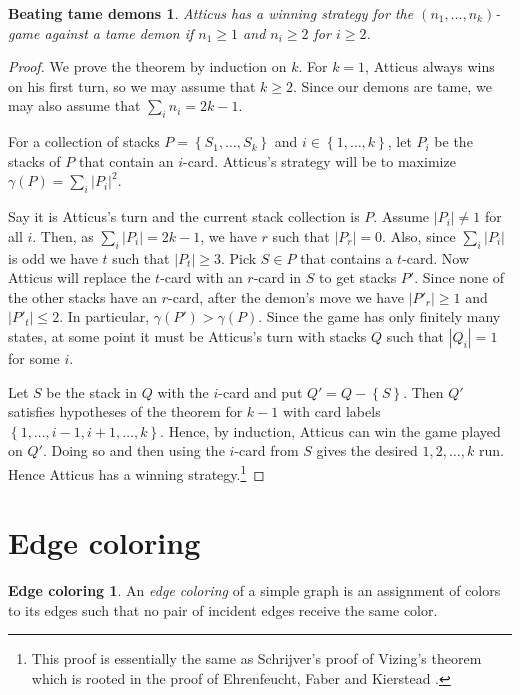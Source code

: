\documentclass[12pt]{article}
\theoremstyle{plain}
\newtheorem*{beattame}{Beating tame demons}
\theoremstyle{definition}
\newtheorem*{edgecoloring}{Edge coloring}
\theoremstyle{remark}
\newcommand{\set}[1]{\left\{ #1 \right\}}
\newcommand{\card}[1]{\left|#1\right|}
\begin{document}
\begin{beattame}
Atticus has a winning strategy for the $(n_1, \ldots, n_k)$-game against a tame demon if $n_1 \geq 1$ and $n_i \geq 2$ for $i \geq 2$.
\end{beattame}
\begin{proof}
We prove the theorem by induction on $k$.  For $k=1$, Atticus always wins on his first turn, so we may assume that $k \geq 2$.  Since our demons are tame, we may also assume that $\sum_i n_i = 2k-1$.

For a collection of stacks $P = \set{S_1, \ldots, S_k}$ and $i \in \set{1, \ldots, k}$, let $P_i$ be the stacks of $P$ that contain an $i$-card.  Atticus's strategy will be to maximize $\gamma(P) = \sum_i \card{P_i}^2$.

Say it is Atticus's turn and the current stack collection is $P$.  Assume $\card{P_i} \neq 1$ for all $i$.  Then, as $\sum_i \card{P_i} = 2k-1$, we have $r$ such that $\card{P_r} = 0$.  Also, since $\sum_i \card{P_i}$ is odd we have $t$ such that $\card{P_t} \geq 3$.  Pick $S \in P$ that contains a $t$-card.  Now Atticus will replace the $t$-card with an $r$-card in $S$ to get stacks $P'$.  Since none of the other stacks have an $r$-card, after the demon's move we have $\card{P'_r} \geq 1$ and $\card{P'_t} \leq 2$.  In particular,  $\gamma(P') > \gamma(P)$.  Since the game has only finitely many states, at some point it must be Atticus's turn with stacks $Q$ such that $\card{Q_i} = 1$ for some $i$.

Let $S$ be the stack in $Q$ with the $i$-card and put $Q' = Q - \set{S}$.  Then $Q'$ satisfies hypotheses of the theorem for $k-1$ with card labels $\set{1, \ldots, i - 1, i + 1, \ldots, k}$.  Hence, by induction, Atticus can win the game played on $Q'$.  Doing so and then using the $i$-card from $S$ gives the desired $1, 2, \ldots, k$ run.  Hence Atticus has a winning strategy.\footnote{This proof is essentially the same as Schrijver's proof of Vizing's theorem \cite{schrijver2003combinatorial} which is rooted in the proof of Ehrenfeucht, Faber and Kierstead \cite{Ehrenfeucht1984159}.}
\end{proof}

\section{Edge coloring}
\begin{edgecoloring}
An \emph{edge coloring} of a simple graph is an assignment of colors to its edges such that no pair of incident edges receive the same color.
\end{edgecoloring}
\end{document}
